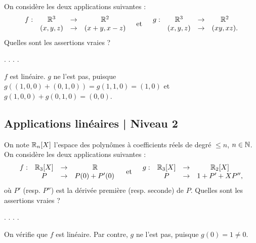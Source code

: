 \begin{question}
On considère les deux applications suivantes : 
$$\begin{array}{rccc}f:&\mathbb{R}^3&\to&\mathbb{R}^2\\
& (x,y,z)&\to &(x+y,x-z) \end{array} \quad \mbox{et} \quad \begin{array}{rccc}g:&\mathbb{R}^3&\to&\mathbb{R}^2\\
& (x,y,z)&\to &(xy,xz). \end{array}$$ 
Quelles sont les assertions vraies ?
\begin{answers}  
.
.
.
.
\end{answers}
\begin{explanations} $f$ est linéaire. $g$ ne l'est pas,
puisque $g((1,0,0)+ (0,1,0)) = g(1,1,0) = (1,0)$ et $ g(1,0,0)+ g(0,1,0) = (0,0)$.
\end{explanations}
\end{question}

\subsection{Applications linéaires | Niveau 2}



\begin{question}
On note $\mathbb{R}_n[X]$ l'espace des polynômes à coefficients réels de degré $\le n$,  $n\in \mathbb{N}$. On considère les deux applications suivantes :
$$\begin{array}{rccc}f:&\mathbb{R}_3[X]&\to&\mathbb{R}\\
& P&\to &P(0)+P'(0)\,  \end{array}   \quad \mbox{et} \quad \begin{array}{rccc}g:&\mathbb{R}_3[X]&\to&\mathbb{R}_2[X]\\
& P&\to &1+P'+XP'',\end{array}$$ 
où $P'$ (resp. $P''$) est la dérivée première (resp. seconde) de $P$. Quelles sont les assertions vraies ?
\begin{answers} 
.
.
.
.
\end{answers}
\begin{explanations} On vérifie que $f$ est linéaire. Par contre, $g$ ne l'est pas, puisque $g(0)=1\neq 0$.
\end{explanations}
\end{question}


